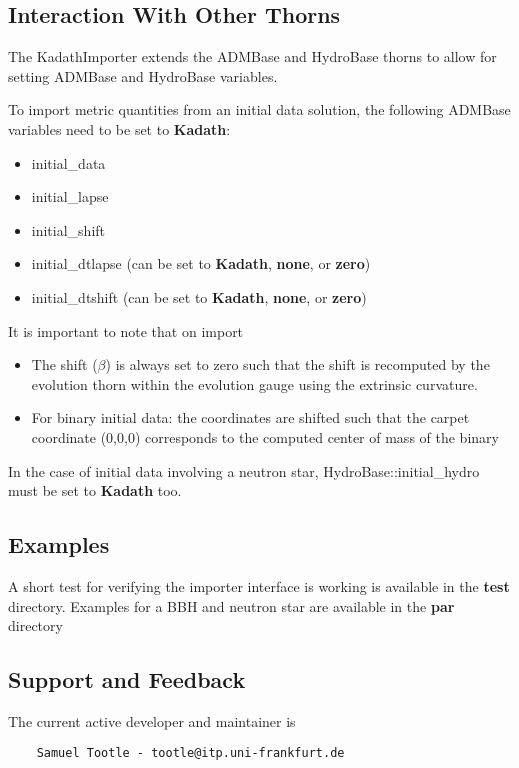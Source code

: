 \subsection{Interaction With Other Thorns}
The KadathImporter extends the ADMBase and HydroBase thorns to allow for
setting ADMBase and HydroBase variables.

To import metric quantities from an initial data solution, the following ADMBase variables need to be set to \textbf{Kadath}:
\begin{itemize}
    \item initial\_data
    \item initial\_lapse
    \item initial\_shift
    \item initial\_dtlapse (can be set to \textbf{Kadath}, \textbf{none}, or \textbf{zero})
    \item initial\_dtshift (can be set to \textbf{Kadath}, \textbf{none}, or \textbf{zero})
\end{itemize}

It is important to note that on import
\begin{itemize}
    \item The shift ($\beta$) is always set to zero such that the shift is recomputed by the evolution thorn within the evolution gauge using the extrinsic curvature.
    \item For binary initial data: the coordinates are shifted such that the carpet coordinate (0,0,0) corresponds to the computed center of mass of the binary
\end{itemize}

In the case of initial data involving a neutron star, HydroBase::initial\_hydro must be set to \textbf{Kadath} too.
\subsection{Examples}
A short test for verifying the importer interface is working is available in the \textbf{test}
directory.  Examples for a BBH and neutron star are available in the \textbf{par} directory

\subsection{Support and Feedback}
The current active developer and maintainer is
\begin{verbatim}
    Samuel Tootle - tootle@itp.uni-frankfurt.de
\end{verbatim}

